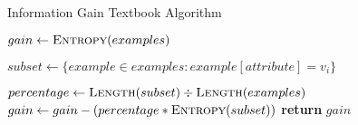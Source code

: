 \begin{algorithm}[H]
\caption{Information Gain Textbook Algorithm}\label{a:id3-gain-simple}
\begin{algorithmic}[1]
    \State $gain \gets \textsc{Entropy}(examples)$

        \State $subset \gets \{example \in examples : example[attribute] = v_i\}$

        \State $percentage \gets \textsc{Length}(subset) \div \textsc{Length}(examples)$
            \State $gain \gets gain - (percentage * \textsc{Entropy}(subset))$
        \EndIf
    \EndFor
    \State \textbf{return} $gain$
\EndProcedure
\end{algorithmic}
\end{algorithm}
